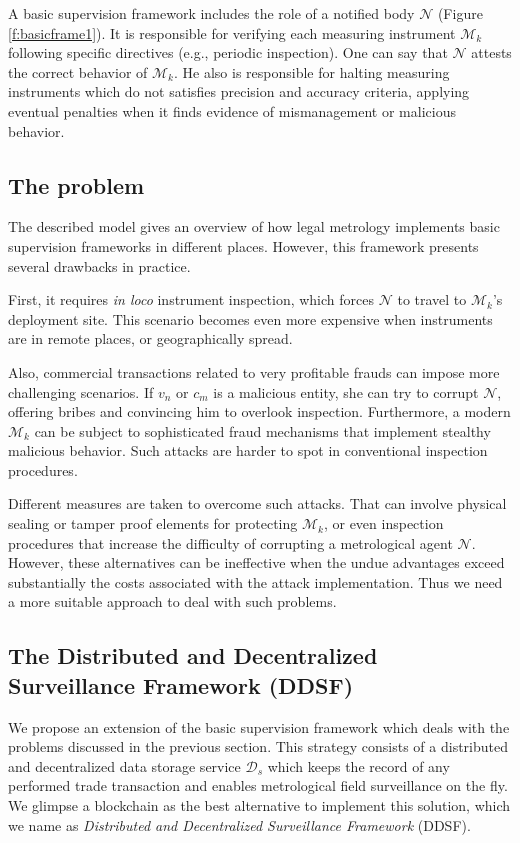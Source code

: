 \documentclass[sigplan]{acmart}
\begin{document}
A basic supervision framework includes the role of a notified body $\mathcal{N}$ (Figure \ref{f:basicframe1}).
It is responsible for verifying each measuring instrument $\mathcal{M}_k$ following specific directives (e.g., periodic inspection).
One can say that $\mathcal{N}$ attests the correct behavior of $\mathcal{M}_k$.
He also is responsible for halting measuring instruments which do not satisfies precision and accuracy criteria, applying eventual penalties when it finds evidence of mismanagement or malicious behavior.

\subsection{The problem}
The described model gives an overview of how legal metrology implements basic supervision frameworks in different places.
However, this framework presents several drawbacks in practice.

First, it requires \textit{in loco} instrument inspection, which forces $\mathcal{N}$ to travel to $\mathcal{M}_k$'s deployment site.
This scenario becomes even more expensive when instruments are in remote places, or geographically spread.

Also, commercial transactions related to very profitable frauds can impose more challenging scenarios.
If $v_n$ or $c_m$ is a malicious entity, she can try to corrupt $\mathcal{N}$, offering bribes and convincing him to overlook inspection.
Furthermore, a modern $\mathcal{M}_k$ can be subject to sophisticated fraud mechanisms that implement stealthy malicious behavior.
Such attacks are harder to spot in conventional inspection procedures.

Different measures are taken to overcome such attacks.
That can involve physical sealing or tamper proof elements for protecting $\mathcal{M}_k$, or even inspection procedures that increase the difficulty of corrupting a metrological agent $\mathcal{N}$.
However, these alternatives can be ineffective when the undue advantages exceed substantially the costs associated with the attack implementation.
Thus we need a more suitable approach to deal with such problems.

\subsection{The Distributed and Decentralized Surveillance Framework (DDSF)}
We propose an extension of the basic supervision framework which deals with the problems discussed in the previous section.
This strategy consists of a distributed and decentralized data storage service $\mathcal{D}_s$ which keeps the record of any performed trade transaction and enables metrological field surveillance on the fly.
We glimpse a blockchain as the best alternative to implement this solution, which we name as \emph{Distributed and Decentralized Surveillance Framework} (DDSF).
\end{document}
